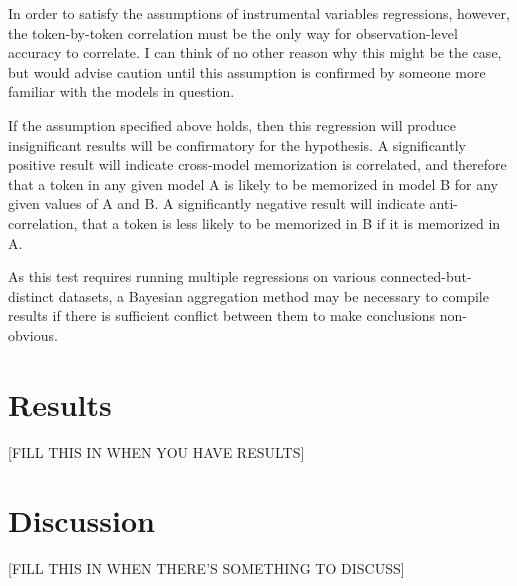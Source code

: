 \documentclass{article}
\begin{document}
In order to satisfy the assumptions of instrumental variables regressions, however, the token-by-token correlation must be the only way for observation-level accuracy to correlate. I can think of no other reason why this might be the case, but would advise caution until this assumption is confirmed by someone more familiar with the models in question.

If the assumption specified above holds, then this regression will produce insignificant results will be confirmatory for the hypothesis. A significantly positive result will indicate cross-model memorization is correlated, and therefore that a token in any given model A is likely to be memorized in model B for any given values of A and B. A significantly negative result will indicate anti-correlation, that a token is less likely to be memorized in B if it is memorized in A.

As this test requires running multiple regressions on various connected-but-distinct datasets, a Bayesian aggregation method may be necessary to compile results if there is sufficient conflict between them to make conclusions non-obvious.

\section{Results}

[FILL THIS IN WHEN YOU HAVE RESULTS]

\section{Discussion}

[FILL THIS IN WHEN THERE'S SOMETHING TO DISCUSS]
\end{document}
